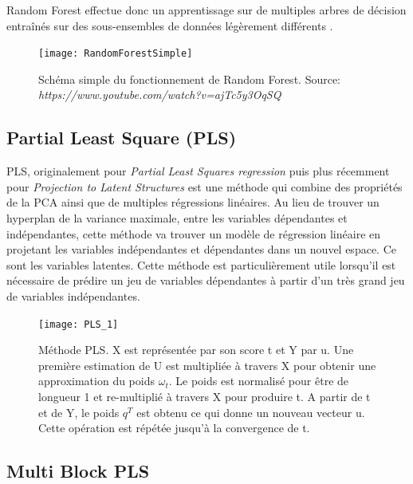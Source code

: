 \noindent Random Forest effectue donc un apprentissage sur de multiples arbres de décision entraînés sur des sous-ensembles de données légèrement différents \cite{Statistics01randomforests}.


\begin{figure}[H]
	\texttt{[image: RandomForestSimple]}
	\caption{\label{RandomForestSchema} Schéma simple du fonctionnement de Random Forest. \newline Source: \textit{https://www.youtube.com/watch?v=ajTc5y3OqSQ}}
\end{figure}

\subsection{Partial Least Square (PLS)} 


PLS, originalement pour \textit{Partial Least Squares regression} puis plus récemment pour \textit{Projection to Latent Structures} est une méthode qui combine des propriétés de la PCA ainsi que de multiples régressions linéaires. Au lieu de trouver un hyperplan de la variance maximale, entre les variables dépendantes et indépendantes, cette méthode va trouver un modèle de régression linéaire en projetant les variables indépendantes et dépendantes dans un nouvel espace. Ce sont les variables latentes. Cette méthode est particulièrement utile lorsqu'il est nécessaire de prédire un jeu de variables dépendantes à partir d'un très grand jeu de variables indépendantes.  

\begin{figure}[H] 
	\centering
	\texttt{[image: PLS\_1]} 
	\caption{\label{PLSschema}Méthode PLS. X est représentée par son score t et Y par u. Une première estimation de U est multipliée à travers X pour obtenir une approximation du poids $ \omega_t $. Le poids est normalisé pour être de longueur 1 et re-multiplié à travers X pour produire t. A partir de t et de Y, le poids $ q^T $ est obtenu ce qui donne un nouveau vecteur u. Cette opération est répétée jusqu'à la convergence de t.\cite{CEM:CEM515}} 
\end{figure} 

\subsection{Multi Block PLS} 

